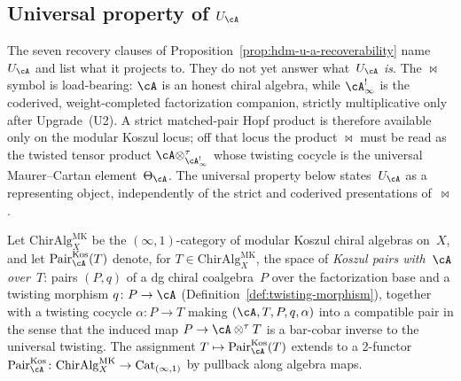 \subsection{Universal property of $U_\cA$}
\label{subsec:hdm-u-a-universal-property}

The seven recovery clauses of
Proposition~\ref{prop:hdm-u-a-recoverability} name~$U_\cA$ and list
what it projects to. They do not yet answer what~$U_\cA$ \emph{is}.
The $\bowtie$ symbol is load-bearing: $\cA$ is an honest chiral
algebra, while $\cA^{!}_\infty$ is the coderived, weight-completed
factorization companion, strictly multiplicative only after
Upgrade~\textup{(U2)}. A strict matched-pair Hopf product is therefore
available only on the modular Koszul locus; off that locus the product
$\bowtie$ must be read as the twisted tensor product
$\cA \otimes^{\tau}_{\cA^{!}_\infty}$ whose twisting cocycle is the
universal Maurer--Cartan element~$\Theta_\cA$. The universal property
below states~$U_\cA$ as a representing object, independently of the
strict and coderived presentations of~$\bowtie$.

Let $\mathrm{ChirAlg}^{\mathrm{MK}}_X$ be the $(\infty,1)$-category of
modular Koszul chiral algebras on~$X$, and let
$\mathrm{Pair}^{\mathrm{Kos}}_\cA(T)$ denote, for $T \in
\mathrm{ChirAlg}^{\mathrm{MK}}_X$, the space of \emph{Koszul pairs
with~$\cA$ over~$T$}: pairs $(P, q)$ of a dg chiral coalgebra~$P$ over
the factorization base and a twisting morphism $q\colon P \to \cA$
\textup{(}Definition~\textup{\ref{def:twisting-morphism}}\textup{)},
together with a twisting cocycle $\alpha\colon P \to T$ making
$(\cA, T, P, q, \alpha)$ into a compatible pair in the sense that the
induced map
$P \to \cA \otimes^{\tau} T$ is a bar-cobar inverse to the universal
twisting. The assignment $T \mapsto \mathrm{Pair}^{\mathrm{Kos}}_\cA(T)$
extends to a 2-functor
$\mathrm{Pair}^{\mathrm{Kos}}_\cA\colon
\mathrm{ChirAlg}^{\mathrm{MK}}_X \to \mathrm{Cat}_{(\infty,1)}$
by pullback along algebra maps.

